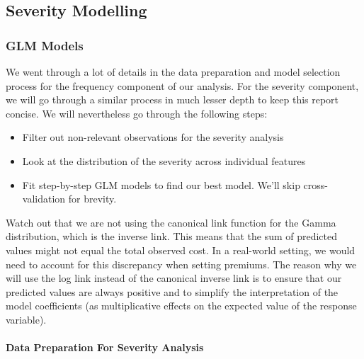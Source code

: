 \documentclass[
  english,
  11pt,
]{article}
\providecommand{\tightlist}{%
  \setlength{\itemsep}{0pt}\setlength{\parskip}{0pt}}
\begin{document}
\subsection{Severity Modelling}\label{severity-modelling}

\subsubsection{GLM Models}\label{glm-models-1}

We went through a lot of details in the data preparation and model
selection process for the frequency component of our analysis. For the
severity component, we will go through a similar process in much lesser
depth to keep this report concise. We will nevertheless go through the
following steps:

\begin{itemize}
\tightlist
\item
  Filter out non-relevant observations for the severity analysis
\item
  Look at the distribution of the severity across individual features
\item
  Fit step-by-step GLM models to find our best model. We'll skip
  cross-validation for brevity.
\end{itemize}

Watch out that we are not using the canonical link function for the
Gamma distribution, which is the inverse link. This means that the sum
of predicted values might not equal the total observed cost. In a
real-world setting, we would need to account for this discrepancy when
setting premiums. The reason why we will use the log link instead of the
canonical inverse link is to ensure that our predicted values are always
positive and to simplify the interpretation of the model coefficients
(as multiplicative effects on the expected value of the response
variable).

\paragraph{Data Preparation For Severity
Analysis}\label{data-preparation-for-severity-analysis}
\end{document}

